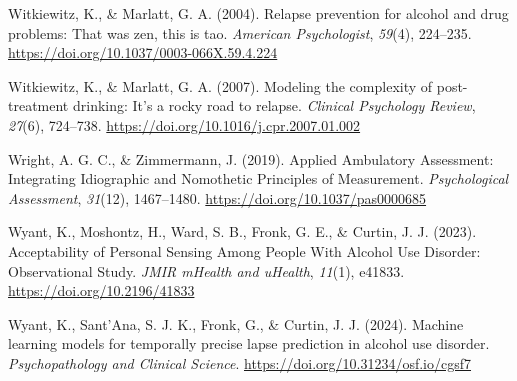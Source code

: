\documentclass[
]{agujournal2019}
\newlength{\cslhangindent}
\newenvironment{CSLReferences}[2] %
 {\begin{list}{}{%
  \setlength{\itemindent}{0pt}
  \setlength{\leftmargin}{0pt}
  \setlength{\parsep}{0pt}
  \ifodd #1
   \setlength{\leftmargin}{\cslhangindent}
   \setlength{\itemindent}{-1\cslhangindent}
  \fi
  \setlength{\itemsep}{#2\baselineskip}}}
 {\end{list}}
\begin{document}
\begin{CSLReferences}{1}{0}
Witkiewitz, K., \& Marlatt, G. A. (2004). Relapse prevention for alcohol
and drug problems: {That} was zen, this is tao. \emph{American
Psychologist}, \emph{59}(4), 224--235.
\url{https://doi.org/10.1037/0003-066X.59.4.224}

Witkiewitz, K., \& Marlatt, G. A. (2007). Modeling the complexity of
post-treatment drinking: {It}'s a rocky road to relapse. \emph{Clinical
Psychology Review}, \emph{27}(6), 724--738.
\url{https://doi.org/10.1016/j.cpr.2007.01.002}

Wright, A. G. C., \& Zimmermann, J. (2019). Applied {Ambulatory
Assessment}: {Integrating Idiographic} and {Nomothetic Principles} of
{Measurement}. \emph{Psychological Assessment}, \emph{31}(12),
1467--1480. \url{https://doi.org/10.1037/pas0000685}

Wyant, K., Moshontz, H., Ward, S. B., Fronk, G. E., \& Curtin, J. J.
(2023). Acceptability of {Personal Sensing Among People With Alcohol Use
Disorder}: {Observational Study}. \emph{JMIR mHealth and uHealth},
\emph{11}(1), e41833. \url{https://doi.org/10.2196/41833}

Wyant, K., Sant'Ana, S. J. K., Fronk, G., \& Curtin, J. J. (2024).
Machine learning models for temporally precise lapse prediction in
alcohol use disorder. \emph{Psychopathology and Clinical Science}.
\url{https://doi.org/10.31234/osf.io/cgsf7}

\end{CSLReferences}
\end{document}
